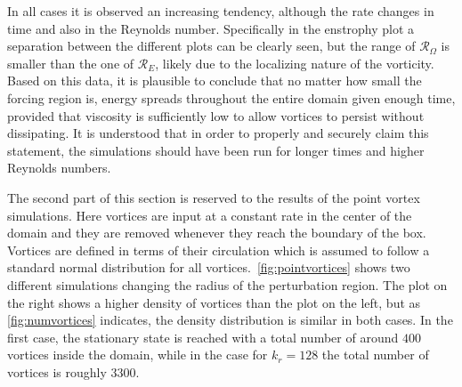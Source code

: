 \documentclass[../main.tex]{subfiles}
\begin{document}
In all cases it is observed an increasing tendency, although the rate changes in time and also in the Reynolds number. Specifically in the enstrophy plot a separation between the different plots can be clearly seen, but the range of $\mathcal{R}_\Omega$ is smaller than the one of $\mathcal{R}_E$, likely due to the localizing nature of the vorticity. Based on this data, it is plausible to conclude that no matter how small the forcing region is, energy spreads throughout the entire domain given enough time, provided that viscosity is sufficiently low to allow vortices to persist without dissipating. It is understood that in order to properly and securely claim this statement, the simulations should have been run for longer times and higher Reynolds numbers.

The second part of this section is reserved to the results of the point vortex simulations. Here vortices are input at a constant rate in the center of the domain and they are removed whenever they reach the boundary of the box. Vortices are defined in terms of their circulation which is assumed to follow a standard normal distribution for all vortices.~\cref{fig:pointvortices} shows two different simulations changing the radius of the perturbation region. The plot on the right shows a higher density of vortices than the plot on the left, but as \cref{fig:numvortices} indicates, the density distribution is similar in both cases. In the first case, the stationary state is reached with a total number of around $ 400$ vortices inside the domain, while in the case for $k_r=128$ the total number of vortices is roughly $3300$.
\end{document}
